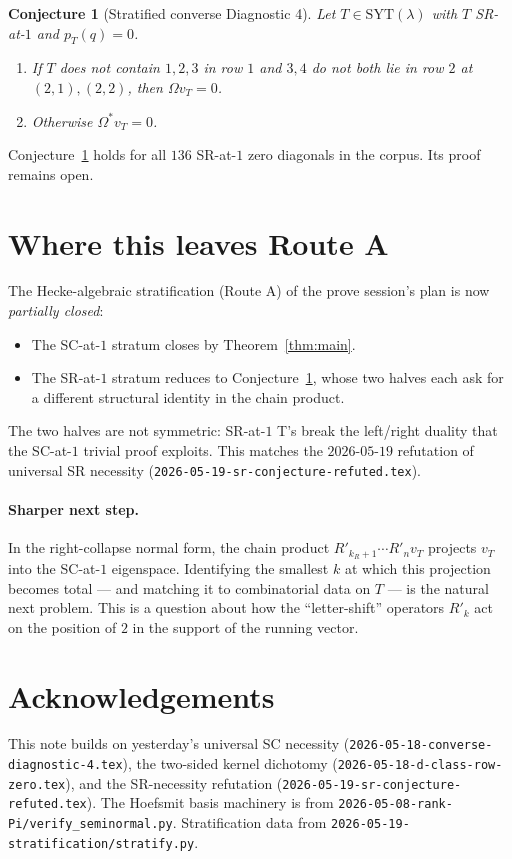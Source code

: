 \documentclass[11pt]{article}
\newtheorem{conjecture}[theorem]{Conjecture}
\theoremstyle{definition}
\newcommand{\la}{\lambda}
\newcommand{\Om}{\Omega}
\newcommand{\Omstar}{\Omega^{*}}
\newcommand{\vT}{v_T}
\begin{document}
\begin{conjecture}[Stratified converse Diagnostic 4]\label{conj:strat}
Let $T \in \mathrm{SYT}(\la)$ with $T$ SR-at-$1$ and $p_T(q) = 0$.
\begin{enumerate}
\item[\textup{(i)}] If $T$ does not contain $1, 2, 3$ in row $1$ and
$3, 4$ do not both lie in row $2$ at $(2,1), (2,2)$, then
$\Om \vT = 0$.
\item[\textup{(ii)}] Otherwise $\Omstar \vT = 0$.
\end{enumerate}
\end{conjecture}

Conjecture~\ref{conj:strat} holds for all $136$ SR-at-$1$ zero
diagonals in the corpus. Its proof remains open.

\section{Where this leaves Route A}

The Hecke-algebraic stratification (Route A) of the prove session's
plan is now \emph{partially closed}:
\begin{itemize}
\item The SC-at-$1$ stratum closes by Theorem~\ref{thm:main}.
\item The SR-at-$1$ stratum reduces to Conjecture~\ref{conj:strat},
      whose two halves each ask for a different structural identity
      in the chain product.
\end{itemize}
The two halves are not symmetric: SR-at-$1$ T's break the left/right
duality that the SC-at-$1$ trivial proof exploits. This matches the
$2026$-$05$-$19$ refutation of universal SR necessity
(\texttt{2026-05-19-sr-conjecture-refuted.tex}).

\paragraph{Sharper next step.}
In the right-collapse normal form, the chain product
$R'_{k_R + 1} \cdots R'_n \vT$ projects $\vT$ into the SC-at-$1$
eigenspace. Identifying the smallest $k$ at which this projection
becomes total --- and matching it to combinatorial data on $T$ --- is
the natural next problem. This is a question about how the
``letter-shift'' operators $R'_k$ act on the position of $2$ in the
support of the running vector.

\section*{Acknowledgements}

This note builds on yesterday's universal SC necessity
(\texttt{2026-05-18-converse-diagnostic-4.tex}), the two-sided kernel
dichotomy (\texttt{2026-05-18-d-class-row-zero.tex}), and the
SR-necessity refutation
(\texttt{2026-05-19-sr-conjecture-refuted.tex}). The Hoefsmit basis
machinery is from
\texttt{2026-05-08-rank-Pi/verify\_seminormal.py}. Stratification
data from
\texttt{2026-05-19-stratification/stratify.py}.
\end{document}

